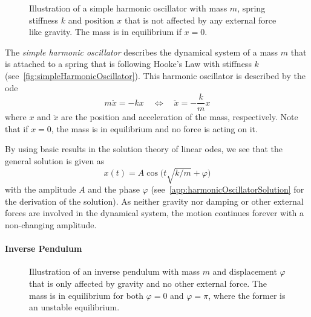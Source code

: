 		\begin{figure}
			\centering
			\tikzHarmonicOscillator
			\caption[Illustration of a simple harmonic oscillator]{Illustration of a simple harmonic oscillator with mass \(m\), spring stiffness \(k\) and position \(x\) that is not affected by any external force like gravity. The mass is in equilibrium if \( x = 0 \).}
			\label{fig:simpleHarmonicOscillator}
		\end{figure}

		The \emph{simple harmonic oscillator} describes the dynamical system of a mass \(m\) that is attached to a spring that is following Hooke's Law with stiffness \(k\) (see~\autoref{fig:simpleHarmonicOscillator}). This harmonic oscillator is described by the \ac{ode}
		\begin{equation}
			m\ddot{x} = -kx \quad\iff\quad \ddot{x} = -\frac{k}{m} x  \label{eq:harmonicOscillator}
		\end{equation}
		where \(x\) and \(\ddot{x}\) are the position and acceleration of the mass, respectively. Note that if \( x = 0 \), the mass is in equilibrium and no force is acting on it.

		By using basic results in the solution theory of linear \acp{ode}, we see that the general solution is given as
		\begin{equation*}
			x(t) = A \cos\Big(t \sqrt{k / m} + \varphi\Big)
		\end{equation*}
		with the amplitude \(A\) and the phase \(\varphi\) (see~\autoref{app:harmonicOscillatorSolution} for the derivation of the solution). As neither gravity nor damping or other external forces are involved in the dynamical system, the motion continues forever with a non-changing amplitude.

	\paragraph{Inverse Pendulum}
		\label{subsec:simplePendulum}

		\begin{figure}
			\centering
			\tikzSimplePendulum
			\caption[Illustration of an inverse pendulum]{Illustration of an inverse pendulum with mass \(m\) and displacement \(\varphi\) that is only affected by gravity and no other external force. The mass is in equilibrium for both \( \varphi = 0 \) and \( \varphi = \pi \), where the former is an unstable equilibrium.}
			\label{fig:simplePendulum}
		\end{figure}

